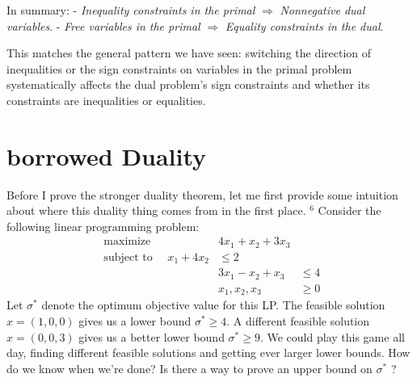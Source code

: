 In summary:
- \emph{Inequality constraints in the primal} $\Rightarrow$ \emph{Nonnegative dual variables}.
- \emph{Free variables in the primal} $\Rightarrow$ \emph{Equality constraints in the dual}.

This matches the general pattern we have seen: switching the direction of inequalities or the sign constraints on variables in the primal problem systematically affects the dual problem's sign constraints and whether its constraints are inequalities or equalities.







\section{borrowed Duality}
Before I prove the stronger duality theorem, let me first provide some intuition about where this duality thing comes from in the first place. ${ }^{6}$ Consider the following linear programming problem:
\begin{align*}
\text { maximize } & 
4 x_{1}+x_{2}+3 x_{3} \\
\text { subject to } \quad x_{1}+4 x_{2} & \leq 2 \\
& 3 x_{1}-x_{2}+x_{3} & \leq 4 \\
& x_{1}, x_{2}, x_{3} & \geq 0
\end{align*}
Let $\sigma^{*}$ denote the optimum objective value for this LP. The feasible solution $x=(1,0,0)$ gives us a lower bound $\sigma^{*} \geq 4$. A different feasible solution $x=(0,0,3)$ gives us a better lower bound $\sigma^{*} \geq 9$. We could play this game all day, finding different feasible solutions and getting ever larger lower bounds. How do we know when we're done? Is there a way to prove an upper bound on $\sigma^{*}$ ?

